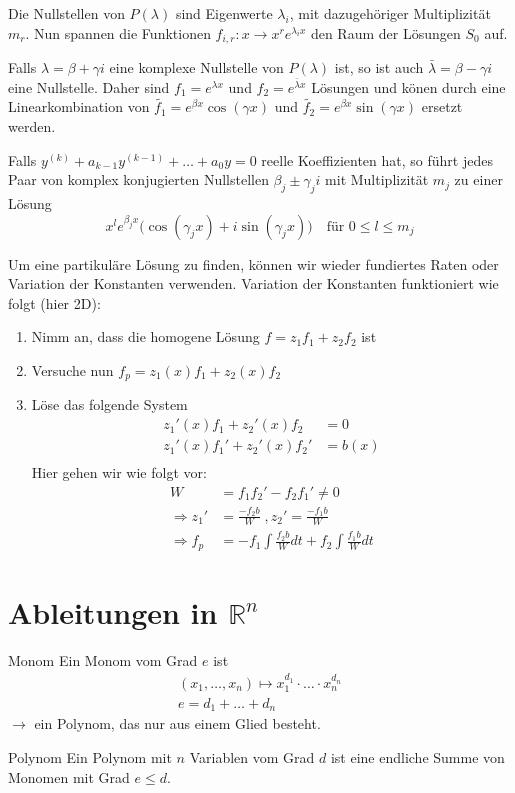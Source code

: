 \documentclass[a4paper,10pt]{article}
\def\R{\mathbb{R}}
\begin{document}
Die Nullstellen von \(P(\lambda)\) sind Eigenwerte \(\lambda_i\), mit dazugehöriger Multiplizität \(m_r\). Nun spannen die Funktionen \(f_{i,r} : x \to x^r e^{\lambda_i x}\) den Raum der Lösungen \(S_0\) auf.

Falls \(\lambda = \beta + \gamma i\) eine komplexe Nullstelle von \(P(\lambda)\) ist, so ist auch 
\(\bar{\lambda} = \beta - \gamma i\) eine Nullstelle. Daher sind \(f_1 = e^{\lambda x}\) und \(f_2 = e^{\bar{\lambda} x}\) Lösungen und könen durch eine Linearkombination von \(\tilde{f_1} = e^{\beta x} \cos(\gamma x)\) und \(\tilde{f_2} = e^{\beta x} \sin(\gamma x)\) ersetzt werden.

Falls \(y^{(k)} + a_{k-1}y^{(k-1)} + \dots + a_0 y = 0\) reelle Koeffizienten hat, so führt jedes Paar von komplex konjugierten Nullstellen $\beta_j \pm \gamma_j i$ mit Multiplizität $m_j$ zu einer Lösung
\[x^l e^{\beta_j x} \Big( \cos(\gamma_j x) + i \sin(\gamma_j x) \Big) \quad \text{für }0 \leq l \leq m_j\]

Um eine partikuläre Lösung zu finden, können wir wieder fundiertes Raten oder Variation der Konstanten verwenden. 
Variation der Konstanten funktioniert wie folgt (hier 2D):

\begin{enumerate}[label=(\arabic*)]
  \item Nimm an, dass die homogene Lösung \(f = z_1 f_1 + z_2 f_2\) ist
  \item Versuche nun \(f_p = z_1(x) f_1 + z_2(x) f_2\)
  \item Löse das folgende System
  \begin{align*}
    z_1'(x) f_1 + z_2'(x) f_2 &= 0\\
    z_1'(x) f_1' + z_2'(x) f_2' &= b(x)\\
  \end{align*}
  Hier gehen wir wie folgt vor:
  \begin{align*}
    W &= f_1 f_2' - f_2 f_1' \neq 0\\
    \Rightarrow z_1' &= \frac{-f_2 b}{W} \; , z_2' = \frac{-f_1 b}{W}\\
    \Rightarrow f_p &= -f_1 \int \frac{f_2 b}{W} dt + f_2 \int \frac{f_1 b}{W} dt
  \end{align*}
\end{enumerate}

\section{Ableitungen in \texorpdfstring{\(\R^n\)}{Rⁿ}}
\begin{subbox}{Monom}
  Ein Monom vom Grad \(e\) ist
  \begin{align*}
    (x_1, \ldots, x_n) \mapsto x_1^{d_1}\cdot \ldots \cdot x_n^{d_n} \\
    e = d_1 + \ldots + d_n 
  \end{align*}
  \(\to\) ein Polynom, das nur aus einem Glied besteht.
\end{subbox}
\begin{mainbox}{Polynom}
  Ein Polynom mit \(n\) Variablen vom Grad \(d\) ist eine endliche Summe von Monomen mit Grad \(e \le d\).
\end{mainbox}
\end{document}
